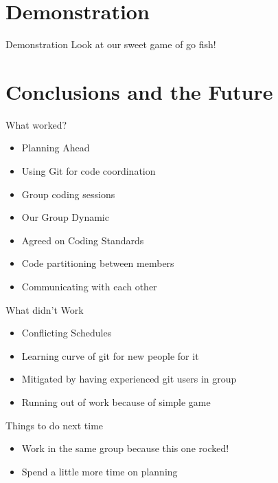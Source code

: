 \documentclass[compress, blue]{beamer}
\begin{document}
\section{Demonstration}

\begin{frame}{Demonstration}
Look at our sweet game of go fish!
\end{frame}

\section{Conclusions and the Future}

\begin{frame}{What worked?}

	\begin{itemize}
		\item Planning Ahead
		\item Using Git for code coordination
		\item Group coding sessions
		\item Our Group Dynamic
		\item Agreed on Coding Standards
		\item Code partitioning between members
		\item Communicating with each other
	\end{itemize}

\end{frame}

\begin{frame}{What didn't Work}

	\begin{itemize}
		\item Conflicting Schedules
		\item Learning curve of git for new people for it
		\item Mitigated by having experienced git users in group
		\item Running out of work because of simple game 
	\end{itemize}

\end{frame}
 
\begin{frame}{Things to do next time}

	\begin{itemize}
		\item Work in the same group because this one rocked!
		\item Spend a little more time on planning 
	\end{itemize}

\end{frame}
\end{document}
